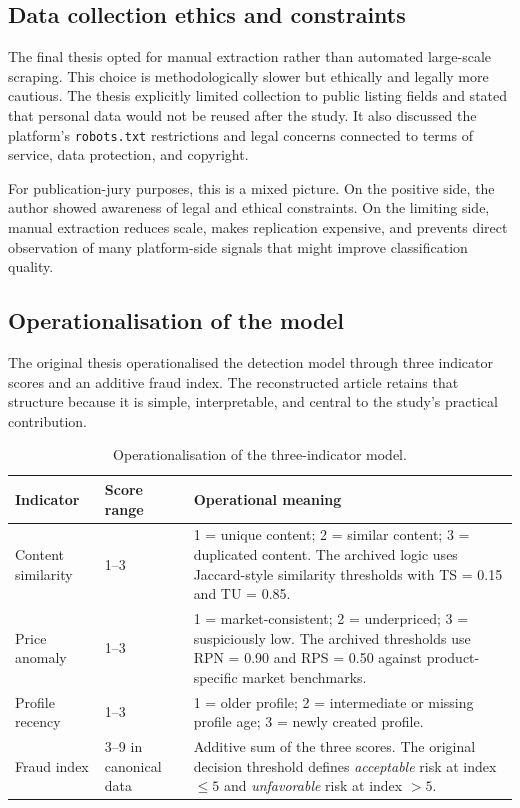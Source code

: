 \documentclass[11pt,a4paper]{article}
\begin{document}
\subsection{Data collection ethics and constraints}
The final thesis opted for manual extraction rather than automated large-scale scraping. This choice is methodologically slower but ethically and legally more cautious. The thesis explicitly limited collection to public listing fields and stated that personal data would not be reused after the study. It also discussed the platform's \texttt{robots.txt} restrictions and legal concerns connected to terms of service, data protection, and copyright.

For publication-jury purposes, this is a mixed picture. On the positive side, the author showed awareness of legal and ethical constraints. On the limiting side, manual extraction reduces scale, makes replication expensive, and prevents direct observation of many platform-side signals that might improve classification quality.

\subsection{Operationalisation of the model}
The original thesis operationalised the detection model through three indicator scores and an additive fraud index. The reconstructed article retains that structure because it is simple, interpretable, and central to the study's practical contribution.

\begin{table}[H]
\centering
\caption{Operationalisation of the three-indicator model.}
\begin{tabularx}{\textwidth}{p{3.2cm} p{1.5cm} Y}
\toprule
\textbf{Indicator} & \textbf{Score range} & \textbf{Operational meaning} \\
\midrule
Content similarity & 1--3 & 1 = unique content; 2 = similar content; 3 = duplicated content. The archived logic uses Jaccard-style similarity thresholds with TS = 0.15 and TU = 0.85. \\
Price anomaly & 1--3 & 1 = market-consistent; 2 = underpriced; 3 = suspiciously low. The archived thresholds use RPN = 0.90 and RPS = 0.50 against product-specific market benchmarks. \\
Profile recency & 1--3 & 1 = older profile; 2 = intermediate or missing profile age; 3 = newly created profile. \\
Fraud index & 3--9 in canonical data & Additive sum of the three scores. The original decision threshold defines \emph{acceptable} risk at index $\leq 5$ and \emph{unfavorable} risk at index $>5$. \\
\bottomrule
\end{tabularx}
\end{table}
\end{document}
